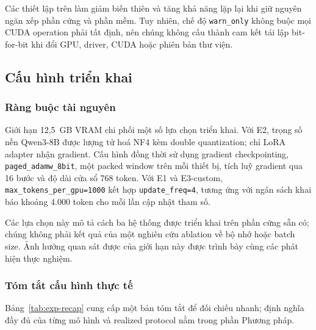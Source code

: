 Các thiết lập trên làm giảm biến thiên và tăng khả năng lặp lại khi giữ nguyên
ngăn xếp phần cứng và phần mềm. Tuy nhiên, chế độ \texttt{warn\_only} không buộc mọi
CUDA operation phải tất định, nên chúng không cấu thành cam kết tái lập
bit-for-bit khi đổi GPU, driver, CUDA hoặc phiên bản thư viện.

\subsection{Cấu hình triển khai}

\subsubsection{Ràng buộc tài nguyên}

Giới hạn 12,5~GB VRAM chi phối một số lựa chọn triển khai. Với E2, trọng số nền
Qwen3-8B được lượng tử hoá NF4 kèm double quantization; chỉ LoRA adapter nhận
gradient. Cấu hình đồng thời sử dụng gradient checkpointing,
\texttt{paged\_adamw\_8bit}, một packed window trên mỗi thiết bị, tích luỹ
gradient qua 16 bước và độ dài cửa sổ 768 token. Với E1 và E3-custom,
\texttt{max\_tokens\_per\_gpu=1000} kết hợp \texttt{update\_freq=4}, tương ứng
với ngân sách khai báo khoảng 4.000 token cho mỗi lần cập nhật tham số.

Các lựa chọn này mô tả cách ba hệ thống được triển khai trên phần cứng sẵn có;
chúng không phải kết quả của một nghiên cứu ablation về bộ nhớ hoặc batch size.
Ảnh hưởng quan sát được của giới hạn này được trình bày cùng các phát hiện thực
nghiệm.

\subsubsection{Tóm tắt cấu hình thực tế}

Bảng~\ref{tab:exp-recap} cung cấp một bản tóm tắt để đối chiếu nhanh; định nghĩa
đầy đủ của từng mô hình và realized protocol nằm trong phần Phương pháp.

